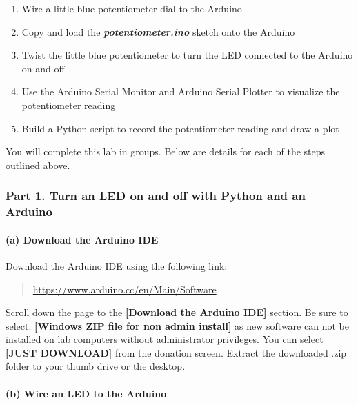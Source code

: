\documentclass[11pt]{article}
\begin{document}
\begin{enumerate}
\def\labelenumi{(\alph{enumi})}
\item
  Wire a little blue potentiometer dial to the Arduino
\item
  Copy and load the \textbf{\emph{potentiometer.ino}} sketch onto the
  Arduino
\item
  Twist the little blue potentiometer to turn the LED connected to the
  Arduino on and off
\item
  Use the Arduino Serial Monitor and Arduino Serial Plotter to visualize
  the potentiometer reading
\item
  Build a Python script to record the potentiometer reading and draw a
  plot
\end{enumerate}

    You will complete this lab in groups. Below are details for each of the
steps outlined above.

\hypertarget{part-1.-turn-an-led-on-and-off-with-python-and-an-arduino}{%
\subsubsection{Part 1. Turn an LED on and off with Python and an
Arduino}\label{part-1.-turn-an-led-on-and-off-with-python-and-an-arduino}}

    \hypertarget{a-download-the-arduino-ide}{%
\paragraph{(a) Download the Arduino
IDE}\label{a-download-the-arduino-ide}}

Download the Arduino IDE using the following link:

\begin{quote}
\url{https://www.arduino.cc/en/Main/Software}
\end{quote}

Scroll down the page to the \textbf{{[}Download the Arduino IDE{]}}
section. Be sure to select: \textbf{{[}Windows ZIP file for non admin
install{]}} as new software can not be installed on lab computers
without administrator privileges. You can select \textbf{{[}JUST
DOWNLOAD{]}} from the donation screen. Extract the downloaded .zip
folder to your thumb drive or the desktop.

    \hypertarget{b-wire-an-led-to-the-arduino}{%
\paragraph{(b) Wire an LED to the
Arduino}\label{b-wire-an-led-to-the-arduino}}
\end{document}
